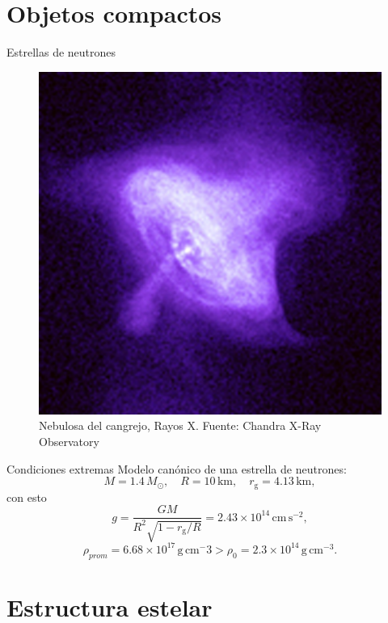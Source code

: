 \documentclass[11pt]{beamer}
\begin{document}
\section{Objetos compactos}
\begin{frame}{Estrellas de neutrones}
    \begin{figure}
        \centering
        \includegraphics[width=0.65\linewidth]{crab.png}
        \caption{ Nebulosa del cangrejo, Rayos X. Fuente: Chandra X-Ray Observatory}
    \end{figure}
\end{frame}

\begin{frame}{Condiciones extremas}
    Modelo canónico de una estrella de neutrones:
    \begin{equation}
        M = 1.4 \,M _ { \odot },\quad R = 10 \,\mathrm { km }, \quad r_{\mathrm{g}}=4.13\,\mathrm{km},
    \end{equation}
    con esto
    \begin{equation}
        g = \frac{ G M }{ R^2\sqrt { 1 - r_{\mathrm{g}} / R }}=2.43 \times 10 ^ { 14 }\, \mathrm { cm\,s } ^ { - 2 },
    \end{equation}
    \begin{equation}
        \rho_{prom}=6.68\times 10^{17}\,\mathrm{g}\, \mathrm{cm^-3} > \rho_0= 2.3 \times 10^{14}\,\mathrm{g}\, \mathrm{cm^{-3}}.
    \end{equation}
\end{frame}

\section{Estructura estelar}
\end{document}

